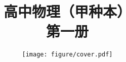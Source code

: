 \documentclass[b5paper, openany]{ctexbook}
\theoremstyle{plain}
\begin{document}














\title{高中物理（甲种本）\\
第一册}



\author{\texttt{[image: figure/cover.pdf]}}
\date{}

\maketitle

\tableofcontents


\frontmatter



\mainmatter
















\backmatter




\begin{appendix}
	
\end{appendix}
\end{document}
